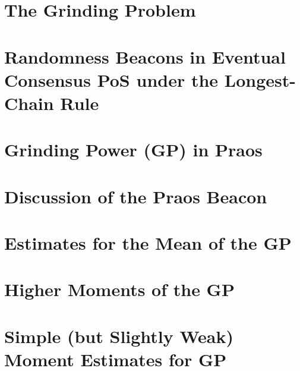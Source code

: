 


\chapter{The Grinding Problem}\label{sec:grinding-intro}


\chapter{Randomness Beacons in Eventual Consensus PoS under the Longest-Chain Rule}\label{sec:model-grinding}


% 

\chapter{Grinding Power (GP) in Praos}\label{sec:praos}


% 


\chapter{Discussion of the Praos Beacon}\label{sec:discussion-praos}



\chapter{Estimates for the Mean of the GP}\label{sec:praos-mean}



\chapter{Higher Moments of the GP}\label{sec:praos-higher-moments}



\chapter{Simple (but Slightly Weak) Moment Estimates for GP}\label{sec:praos-simple-moments}



